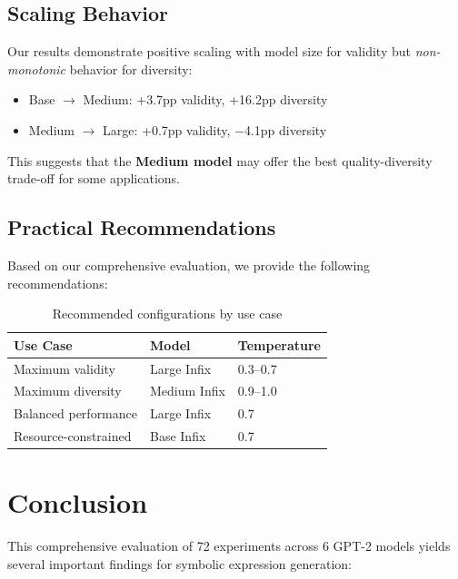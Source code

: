 \documentclass[11pt,a4paper]{article}
\begin{document}
\subsection{Scaling Behavior}

Our results demonstrate positive scaling with model size for validity but \textit{non-monotonic} behavior for diversity:

\begin{itemize}
    \item Base $\rightarrow$ Medium: +3.7pp validity, +16.2pp diversity
    \item Medium $\rightarrow$ Large: +0.7pp validity, $-$4.1pp diversity
\end{itemize}

This suggests that the \textbf{Medium model} may offer the best quality-diversity trade-off for some applications.

\subsection{Practical Recommendations}

Based on our comprehensive evaluation, we provide the following recommendations:

\begin{table}[H]
\centering
\caption{Recommended configurations by use case}
\label{tab:recommendations}
\begin{tabular}{lll}
\toprule
\textbf{Use Case} & \textbf{Model} & \textbf{Temperature} \\
\midrule
Maximum validity & Large Infix & 0.3--0.7 \\
Maximum diversity & Medium Infix & 0.9--1.0 \\
Balanced performance & Large Infix & 0.7 \\
Resource-constrained & Base Infix & 0.7 \\
\bottomrule
\end{tabular}
\end{table}

\section{Conclusion}

This comprehensive evaluation of 72 experiments across 6 GPT-2 models yields several important findings for symbolic expression generation:
\end{document}
